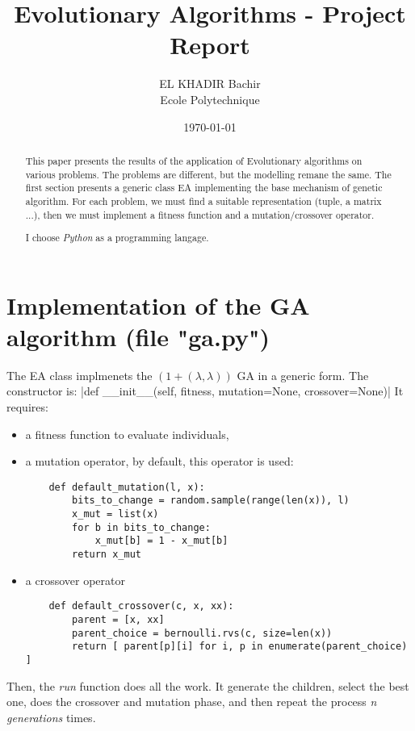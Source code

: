 \documentclass{article}
\begin{document}
\title{Evolutionary Algorithms - Project Report }
\author{EL KHADIR Bachir \\
Ecole Polytechnique}
\date{\today}
\maketitle


\begin{abstract}
This paper presents the results of the application of Evolutionary algorithms on various problems. The problems are different, but the modelling remane the same. The first section presents a generic class EA implementing the base mechanism of genetic algorithm. For each problem, we must find a suitable representation (tuple, a matrix ...), then we must implement a fitness function and a mutation/crossover operator.

I choose \textit{Python} as a programming langage.
\end{abstract}

\tableofcontents

\section{Implementation of the GA algorithm (file "ga.py") }
The EA class implmenets the $(1+(\lambda, \lambda))$ GA in a generic form. The constructor is:
|def __init__(self, fitness, mutation=None, crossover=None)|
It requires:
\begin{itemize}
	\item a fitness function to evaluate individuals,
	\item a mutation operator, by default, this operator is used:
\begin{verbatim}
	def default_mutation(l, x):
		bits_to_change = random.sample(range(len(x)), l)
		x_mut = list(x)
		for b in bits_to_change:
			x_mut[b] = 1 - x_mut[b]
		return x_mut
\end{verbatim}
	\item a crossover operator
\begin{verbatim}
	def default_crossover(c, x, xx):
		parent = [x, xx]
		parent_choice = bernoulli.rvs(c, size=len(x))
		return [ parent[p][i] for i, p in enumerate(parent_choice) ]
\end{verbatim}
		
\end{itemize}

Then, the \textit{run} function does all the work. It generate the children, select the best one, does the crossover and mutation phase, and then repeat the process \textit{n generations} times.  
\end{document}

